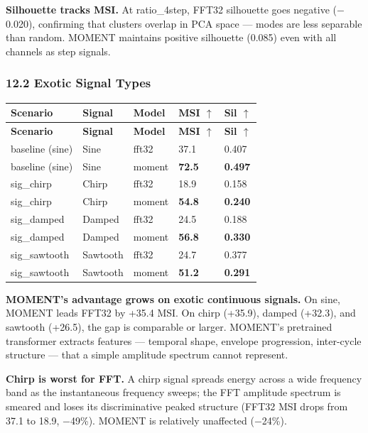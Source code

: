 \documentclass[11pt,a4paper]{article}
\begin{document}
\textbf{Silhouette tracks MSI.} At ratio\_4step, FFT32 silhouette goes negative ($-$0.020), confirming
that clusters overlap in PCA space --- modes are less separable than random. MOMENT maintains
positive silhouette (0.085) even with all channels as step signals.

\subsubsection{12.2 Exotic Signal Types}

\begin{longtable}{|l|l|l|l|l|}
\hline
\textbf{Scenario} & \textbf{Signal} & \textbf{Model} & \textbf{MSI $\uparrow$} & \textbf{Sil $\uparrow$} \\
\hline
\endfirsthead
\hline
\textbf{Scenario} & \textbf{Signal} & \textbf{Model} & \textbf{MSI $\uparrow$} & \textbf{Sil $\uparrow$} \\
\hline
\endhead
\hline
\endfoot
baseline (sine) & Sine & fft32 & 37.1 & 0.407 \\
\hline
baseline (sine) & Sine & moment & \textbf{72.5} & \textbf{0.497} \\
\hline
sig\_chirp & Chirp & fft32 & 18.9 & 0.158 \\
\hline
sig\_chirp & Chirp & moment & \textbf{54.8} & \textbf{0.240} \\
\hline
sig\_damped & Damped & fft32 & 24.5 & 0.188 \\
\hline
sig\_damped & Damped & moment & \textbf{56.8} & \textbf{0.330} \\
\hline
sig\_sawtooth & Sawtooth & fft32 & 24.7 & 0.377 \\
\hline
sig\_sawtooth & Sawtooth & moment & \textbf{51.2} & \textbf{0.291} \\
\hline
\end{longtable}

\textbf{MOMENT's advantage grows on exotic continuous signals.} On sine, MOMENT leads FFT32 by +35.4
MSI. On chirp (+35.9), damped (+32.3), and sawtooth (+26.5), the gap is comparable or larger.
MOMENT's pretrained transformer extracts features --- temporal shape, envelope progression,
inter-cycle structure --- that a simple amplitude spectrum cannot represent.

\textbf{Chirp is worst for FFT.} A chirp signal spreads energy across a wide frequency band as the
instantaneous frequency sweeps; the FFT amplitude spectrum is smeared and loses its discriminative
peaked structure (FFT32 MSI drops from 37.1 to 18.9, $-$49\%). MOMENT is relatively unaffected
($-$24\%).
\end{document}
